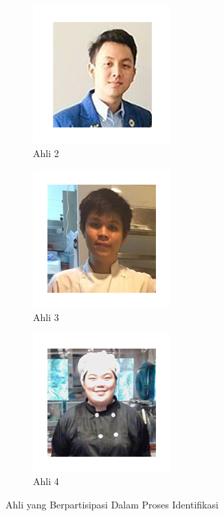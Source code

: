 \begin{figure}[H]
\begin{subfigure}{.25\linewidth}{
				\includegraphics[width=1\linewidth]{gambar/ahli/harley}
				\caption{Ahli 2}
				\label{ahli_2}				
			}
			\end{subfigure}%
			\begin{subfigure}{.25\linewidth}{
				\includegraphics[width=1\linewidth]{gambar/ahli/nico}
				\caption{Ahli 3}
				\label{ahli_3}				
			}
			\end{subfigure}%
			\begin{subfigure}{.25\linewidth}{
				\includegraphics[width=1\linewidth]{gambar/ahli/okky}
				\caption{Ahli 4}
				\label{ahli_4}				
			}
			\end{subfigure}%
			\caption{Ahli yang Berpartisipasi Dalam Proses Identifikasi}
			\label{para_ahli}
		\end{figure}
		
